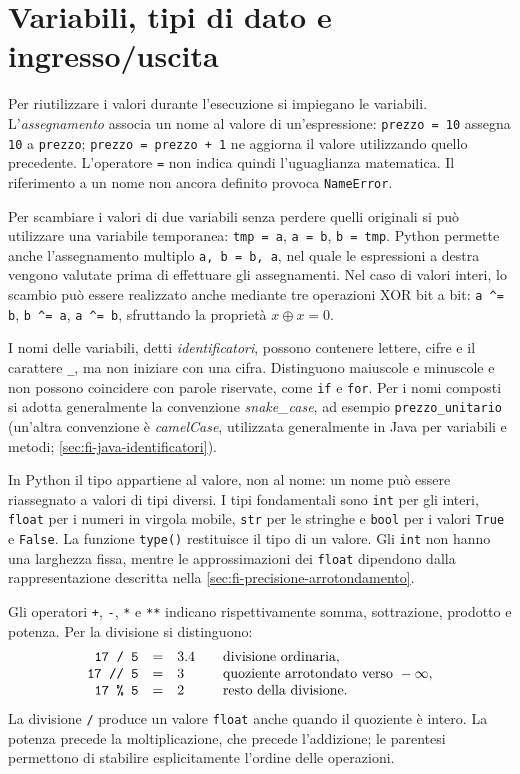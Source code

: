 \section{Variabili, tipi di dato e ingresso/uscita}
\label{sec:fi-python-variabili}

Per riutilizzare i valori durante l'esecuzione si impiegano le variabili.
L'\emph{assegnamento} associa un nome al valore di un'espressione:
\texttt{prezzo = 10} assegna \texttt{10} a \texttt{prezzo};
\texttt{prezzo = prezzo + 1} ne aggiorna il valore utilizzando quello
precedente. L'operatore \texttt{=} non indica quindi l'uguaglianza
matematica. Il riferimento a un nome non ancora definito provoca
\texttt{NameError}.

Per scambiare i valori di due variabili senza perdere quelli originali
si può utilizzare una variabile temporanea: \texttt{tmp = a},
\texttt{a = b}, \texttt{b = tmp}. Python permette anche l'assegnamento
multiplo \texttt{a, b = b, a}, nel quale le espressioni a destra vengono
valutate prima di effettuare gli assegnamenti. Nel caso di valori interi,
lo scambio può essere realizzato anche mediante tre operazioni XOR
bit a bit: \verb|a ^= b|, \verb|b ^= a|, \verb|a ^= b|,
sfruttando la proprietà \(x \oplus x = 0\).

I nomi delle variabili, detti \emph{identificatori}, possono contenere
lettere, cifre e il carattere \texttt{\_}, ma non iniziare con una cifra.
Distinguono maiuscole e minuscole e non possono coincidere con parole
riservate, come \texttt{if} e \texttt{for}. Per i nomi composti si adotta
generalmente la convenzione \emph{snake\_case}, ad esempio
\texttt{prezzo\_unitario} (un'altra convenzione è \emph{camelCase},
utilizzata generalmente in Java per variabili e metodi;
\cref{sec:fi-java-identificatori}).

In Python il tipo appartiene al valore, non al nome: un nome può essere
riassegnato a valori di tipi diversi. I tipi fondamentali sono
\texttt{int} per gli interi, \texttt{float} per i numeri in virgola mobile,
\texttt{str} per le stringhe e \texttt{bool} per i valori
\texttt{True} e \texttt{False}. La funzione \texttt{type()} restituisce
il tipo di un valore. Gli \texttt{int} non hanno una larghezza fissa,
mentre le approssimazioni dei \texttt{float} dipendono dalla
rappresentazione descritta nella
\cref{sec:fi-precisione-arrotondamento}.

Gli operatori \texttt{+}, \texttt{-}, \texttt{*} e \texttt{**} indicano
rispettivamente somma, sottrazione, prodotto e potenza. Per la divisione
si distinguono:
\[
\begin{array}{rcl@{\qquad}l}
  \texttt{17 / 5}  &=& 3.4 & \text{divisione ordinaria},\\
  \texttt{17 // 5} &=& 3 & \text{quoziente arrotondato verso }-\infty,\\
  \texttt{17 \% 5}  &=& 2 & \text{resto della divisione}.
\end{array}
\]
La divisione \texttt{/} produce un valore \texttt{float} anche quando il
quoziente è intero. La potenza precede la moltiplicazione, che precede
l'addizione; le parentesi permettono di stabilire esplicitamente l'ordine
delle operazioni.

